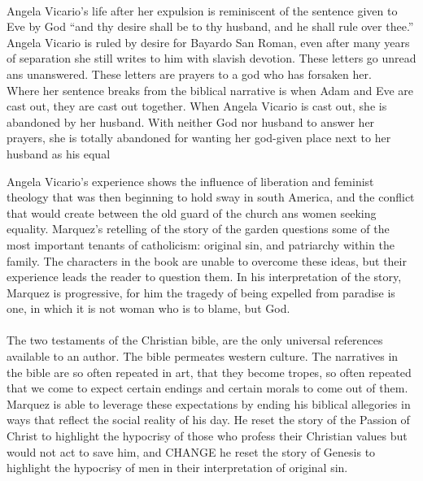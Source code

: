 \documentclass[11pt,a4wide]{article}
\begin{document}
\paragraph{} Angela Vicario's life after her expulsion is reminiscent of the 
sentence given to Eve by God ``and thy desire shall be to thy husband, and he 
shall rule over thee.\cite[Genesis 3:16]{bible}'' Angela Vicario is ruled by 
desire for Bayardo San Roman, even after many years of separation she still 
writes to him with slavish devotion. These letters go unread ans unanswered. 
These letters are prayers to a god who has forsaken her.\\
Where her sentence breaks from the biblical narrative is when Adam and Eve
are cast out, they are cast out together. When Angela Vicario is cast out, she 
is abandoned by her husband. With neither God nor husband to answer her prayers,
she is totally abandoned for wanting her god-given place next to her husband as
his equal

Angela Vicario's experience shows the influence of liberation and feminist 
theology that was then beginning to hold sway in south America, and the 
conflict that would create between the old guard of the church ans women
seeking equality.\cite{lib-theo} 
Marquez's retelling of the story of the garden questions some of the most 
important tenants of catholicism: original sin, and patriarchy within the 
family. The characters in the book are unable to overcome these ideas, but their 
experience leads the reader to question them. In his interpretation of the 
story, Marquez is progressive, for him the tragedy of being expelled from 
paradise is one, in which it is not
woman who is to blame, but God.

\paragraph{} The two testaments of the Christian bible, are the only universal 
references available to an author. The bible permeates
western culture. The narratives in the bible are so often repeated in art, that 
they become tropes, so often repeated that we come to expect certain endings and 
certain morals to come out of them.  Marquez is able to leverage these 
expectations by ending his biblical allegories in ways that reflect the social 
reality of his day. He reset the story of the Passion of Christ to highlight the 
hypocrisy of those who profess their Christian values but would not act to save 
him, and CHANGE
he reset the story of Genesis to highlight the hypocrisy of men in their 
interpretation of original sin.
\end{document}
